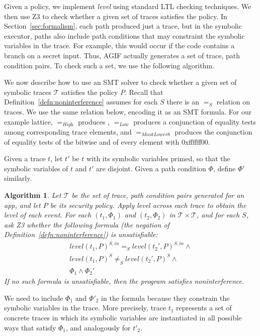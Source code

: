 \documentclass[10pt,conference,compsocconf]{IEEEtran}
\newcommand{\code}[1]{\text{\lstinline!#1!}}
\newtheorem{algorithm}{Algorithm}
\newcommand{\toolname}{AGIF\xspace}
\newcommand{\tr}{t\xspace}
\newcommand{\tset}{\ensuremath{\mathcal{T}}\xspace}
\newcommand{\tleveltr}[2]{\textit{level}(#1, #2)}
\begin{document}
Given a policy, we implement \emph{level} using standard LTL checking
techniques. We then use Z3 to check whether a
given set of traces satisfies the policy. In
Section~\ref{sec:formalism}, each path produced just a trace, but in
the symbolic executor, paths also include path conditions that may
constraint the symbolic variables in the trace. For example, this
would occur if the code contains a branch on a secret input. Thus,
\toolname{} actually generates a set of trace, path condition
pairs. To check such a set, we use the following algorithm.

We now describe how to use an SMT solver to check whether a given set
of symbolic traces $\tset$ satisfies the policy $P$. Recall that
Definition~\ref{defn:noninterference} assumes for each $S$ there is an
$=_S$ relation on traces. We use the same relation below, encoding it
as an SMT formula. For our example lattice, $=_\textit{High}$ produces
\code{true}, $=_\textit{Low}$ produces a conjunction of equality tests
among corresponding trace elements, and $=_\textit{MaskLower8}$
produces the conjunction of equality tests of the bitwise and of every
element with 0xffffff00.

Given a trace
$t$, let $t'$ be $t$ with its symbolic variables primed, so that the
symbolic variables of $t$ and $t'$ are disjoint. Given a path
condition $\Phi$, define $\Phi'$ similarly.

\begin{algorithm}
  Let $\tset$ be the set of trace, path condition pairs generated for
  an app, and let $P$ be its security policy. Apply \emph{level}
  across each trace to obtain the level of each event.  For each
  $(t_1, \Phi_1)$ and $(t_2, \Phi_2)$ in $\tset\times\tset$, and for
  each $S$, ask Z3 whether the following formula (the negation of
  Definition~\ref{defn:noninterference}) is unsatisfiable:
  \begin{displaymath}
    \begin{array}{c}
      \tleveltr{\tr_1}{P}^{S,in} =_S \tleveltr{\tr_2'}{P}^{S,in} \land \\
      \tleveltr{\tr_1}{P}^S \neq_S \tleveltr{\tr_2'}{P}^S \land \\
      \Phi_1 \land \Phi_2'
    \end{array}
  \end{displaymath}
  If no such formula is unsatisfiable, then the program satisfies noninterference.
\end{algorithm}
We need to include $\Phi_1$ and $\Phi'_2$ in the formula because they
constrain the symbolic variables in the trace. More precisely, trace
$\tr_1$ represents a set of concrete traces in which its symbolic
variables are instantiated in all possible ways that satisfy $\Phi_1$,
and analogously for $\tr'_2$.
\end{document}
